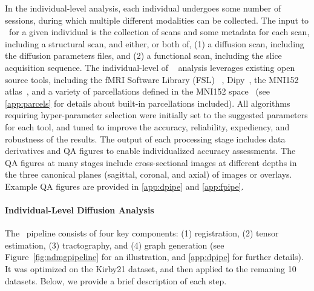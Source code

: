 \documentclass[11pt]{article}
\begin{document}
\begin{multicols}{2}
In the individual-level analysis, each individual  undergoes some number of sessions, during which multiple different modalities can be collected.
The input to \ndmg~for a given individual is  the collection of scans and some metadata for each scan, including a structural scan, %
and either, or both of, (1) a diffusion scan, including the diffusion parameters files,  and (2) a functional scan, including the slice acquisition sequence.
The individual-level of \ndmg~ analysis leverages existing open source tools, including
the fMRI Software Library (FSL) ~\cite{fsl1, fsl2, fsl3}, Dipy~\cite{dipy}, the MNI152 atlas~\cite{mni152}, and a variety of parcellations defined in the MNI152 space~\cite{desikan, aal, jhu, harvardoxford, talairach, slab907, slab1068, pvt, glasser} (see \ref{app:parcels} for details about built-in parcellations included). 
All algorithms requiring hyper-parameter selection were initially set to the suggested parameters for each tool, and tuned to improve the accuracy, reliability, expediency, and robustness of the results.
The output of each processing stage includes data derivatives and QA figures to enable individualized accuracy assessments.
The QA figures at many stages include cross-sectional images at different depths in the three canonical planes (sagittal, coronal, and axial) of images or overlays. Example QA figures are provided in \ref{app:dpipe} and \ref{app:fpipe}.

\paragraph{Individual-Level Diffusion Analysis}

The \ndmgd~pipeline consists of four key components: (1) registration, (2) tensor estimation, (3) tractography, and (4) graph generation (see Figure~\ref{fig:ndmgpipeline} for an illustration, and 
\ref{app:dpipe} for further details). It was optimized on the Kirby21 dataset, and then applied to the remaning 10 datasets.
Below, we provide a brief description of each step.


\end{multicols}
\end{document}
